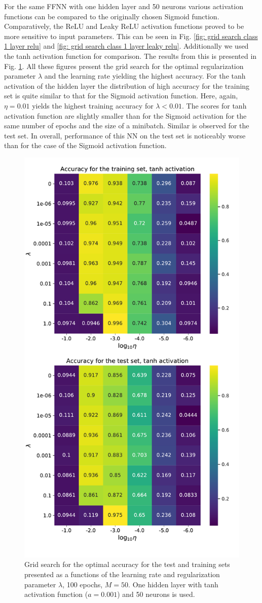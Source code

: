 \documentclass{emulateapj}
\begin{document}
For the same FFNN with one hidden layer and 50 neurons various activation functions can be compared to the originally chosen Sigmoid function.
Comparatively, the ReLU and Leaky ReLU activation functions proved to be more sensitive to input parameters. This can be seen in Fig. \ref{fig: grid search class 1 layer relu} and \ref{fig: grid search class 1 layer leaky relu}. Additionally we used the tanh activation function for comparison. The results from this is presented in Fig. \ref{fig: grid search class 1 layer tanh}. All these figures present the grid search for the optimal regularization parameter $\lambda$ and the learning rate yielding the highest accuracy. For the tanh activation of the hidden layer the distribution of high accuracy for the training set is quite similar to that for the Sigmoid activation function. Here, again, $\eta=0.01$ yields the highest training accuracy for $\lambda<0.01$. The scores for tanh activation function are slightly smaller than for the Sigmoid activation for the same number of epochs and the size of a minibatch. Similar is observed for the test set. In overall, performance of this NN on the test set is noticeably worse than for the case of the Sigmoid activation function.


\begin{figure}[!htb]
    \centering
    \includegraphics[width=.49\textwidth]{Figures/Class_ridge_1_layer_tanh.pdf}
    \caption{Grid search for the optimal accuracy for the test and training sets presented as a functions of the learning rate and regularization parameter $\lambda$, 100 epochs, $M=50$. One hidden layer with tanh activation function ($a=0.001$) and 50 neurons is used.}
    \label{fig: grid search class 1 layer tanh}
\end{figure}
\end{document}
